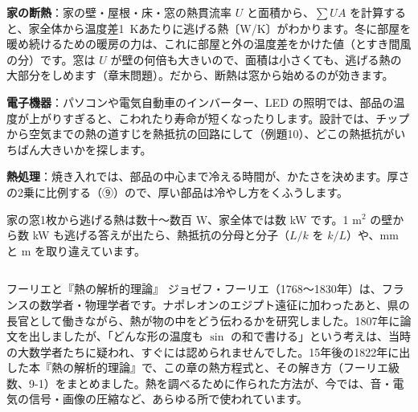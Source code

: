 \begin{phkougaku}
\textbf{家の断熱}：家の壁・屋根・床・窓の熱貫流率 $U$ と面積から、$\sum UA$ を計算すると、家全体から温度差\qty{1}{K}あたりに逃げる熱〔W/K〕がわかります。冬に部屋を暖め続けるための暖房の力は、これに部屋と外の温度差をかけた値（とすき間風の分）です。窓は $U$ が壁の何倍も大きいので、面積は小さくても、逃げる熱の大部分をしめます（章末問題）。だから、断熱は窓から始めるのが効きます。

\textbf{電子機器}：パソコンや電気自動車のインバーター、LED の照明では、部品の温度が上がりすぎると、こわれたり寿命が短くなったりします。設計では、チップから空気までの熱の道すじを熱抵抗の回路にして（例題10）、どこの熱抵抗がいちばん大きいかを探します。

\textbf{熱処理}：焼き入れでは、部品の中心まで冷える時間が、かたさを決めます。厚さの2乗に比例する（⑨）ので、厚い部品は冷やし方をくふうします。

\begin{phketa}[熱伝導の数の目安]
家の窓1枚から逃げる熱は数十〜数百 W、家全体では数 kW です。1 m$^2$ の壁から数 kW も逃げる答えが出たら、熱抵抗の分母と分子（$L/k$ を $k/L$）や、mm と m を取り違えています。
\end{phketa}
\end{phkougaku}

\begin{column}{フーリエと『熱の解析的理論』}
ジョゼフ・フーリエ（1768〜1830年）は、フランスの数学者・物理学者です。ナポレオンのエジプト遠征に加わったあと、県の長官として働きながら、熱が物の中をどう伝わるかを研究しました。1807年に論文を出しましたが、「どんな形の温度も $\sin$ の和で書ける」という考えは、当時の大数学者たちに疑われ、すぐには認められませんでした。15年後の1822年に出した本『熱の解析的理論』で、この章の熱方程式と、その解き方（フーリエ級数、9-1）をまとめました。熱を調べるために作られた方法が、今では、音・電気の信号・画像の圧縮など、あらゆる所で使われています。
\end{column}

